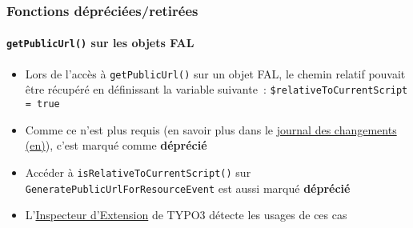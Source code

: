 %

\begin{frame}[fragile]
	\frametitle{Fonctions dépréciées/retirées}
	\framesubtitle{\texttt{getPublicUrl()} sur les objets FAL}

	\begin{itemize}
		\item Lors de l'accès à \texttt{getPublicUrl()} sur un objet FAL, le chemin relatif
			pouvait être récupéré en définissant la variable suivante~:\newline
			\small\texttt{\$relativeToCurrentScript = true}\normalsize
		\item Comme ce n'est plus requis (en savoir plus dans le
			\href{https://docs.typo3.org/c/typo3/cms-core/master/en-us/Changelog/11.3/Deprecation-94193-PublicUrlWithRelativePathsInFALAPI.html}{journal des changements (en)}),
			c'est marqué comme \textbf{déprécié}
		\item Accéder à \texttt{isRelativeToCurrentScript()} sur
			\texttt{GeneratePublicUrlForResourceEvent} est aussi marqué
			\textbf{déprécié}
		\item L'\href{https://docs.typo3.org/m/typo3/reference-coreapi/master/en-us/ApiOverview/ExtensionScanner/Index.html}{Inspecteur d'Extension}
			de TYPO3 détecte les usages de ces cas

	\end{itemize}

\end{frame}

